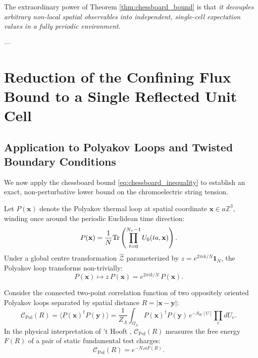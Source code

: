 The extraordinary power of Theorem \ref{thm:chessboard_bound} is that \emph{it decouples arbitrary non-local spatial observables into independent, single-cell expectation values in a fully periodic environment}.

---

\section{Reduction of the Confining Flux Bound to a Single Reflected Unit Cell}
\label{sec:reduction_single_cell}

\subsection{Application to Polyakov Loops and Twisted Boundary Conditions}
\label{subsec:polyakov_twisted_application}

We now apply the chessboard bound \eqref{eq:chessboard_inequality} to establish an exact, non-perturbative lower bound on the chromoelectric string tension.

Let $P(\mathbf{x})$ denote the Polyakov thermal loop at spatial coordinate $\mathbf{x} \in a \mathbb{Z}^3$, winding once around the periodic Euclidean time direction:
\begin{equation}
\label{eq:ch11_polyakov_loop_def}
P(\mathbf{x}) = \frac{1}{N} \mathrm{Tr}\left( \prod_{t=0}^{N_\tau-1} U_0(t a, \mathbf{x}) \right).
\end{equation}
Under a global centre transformation $\hat{\mathcal{Z}}$ parameterized by $z = e^{2\pi i k / N} \mathbf{1}_N$, the Polyakov loop transforms non-trivially:
\begin{equation}
P(\mathbf{x}) \mapsto z \, P(\mathbf{x}) = e^{2\pi i k / N} \, P(\mathbf{x}).
\end{equation}

Consider the connected two-point correlation function of two oppositely oriented Polyakov loops separated by spatial distance $R = |\mathbf{x} - \mathbf{y}|$:
\begin{equation}
\label{eq:ch11_polyakov_correlator}
\mathcal{C}_{\mathrm{Pol}}(R) = \langle P(\mathbf{x})^\dagger P(\mathbf{y}) \rangle = \frac{1}{Z_\Lambda} \int_{\Omega_\Lambda} P(\mathbf{x})^\dagger P(\mathbf{y}) \, e^{-S_W[U]} \prod_e dU_e.
\end{equation}
In the physical interpretation of 't Hooft \cite{tHooft1978}, $\mathcal{C}_{\mathrm{Pol}}(R)$ measures the free energy $F(R)$ of a pair of static fundamental test charges:
\begin{equation}
\mathcal{C}_{\mathrm{Pol}}(R) = e^{-N_\tau a F(R)}.
\end{equation}

